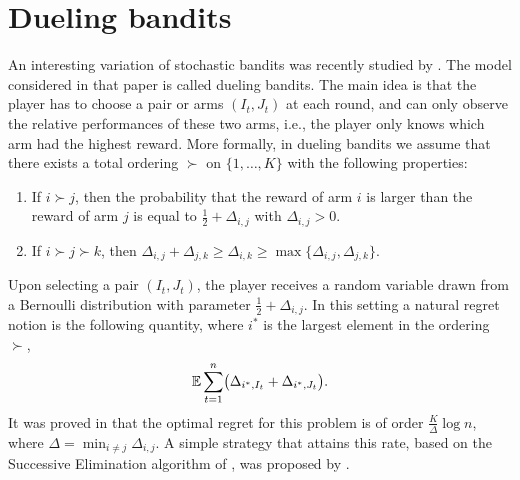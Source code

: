 \section{Dueling bandits} \label{sec:dueling}
An interesting variation of stochastic bandits was recently studied by \cite{YBKJ09}. The model considered in that paper is called dueling bandits. The main idea is that the player has to choose a pair or arms $(I_t, J_t)$ at each round, and can only observe the relative performances of these two arms, i.e., the player only knows which arm had the highest reward. More formally, in dueling bandits we assume that there exists a total ordering $\succ$ on $\{1,\hdots,K\}$ with the following properties:
\begin{enumerate}
\item If $i \succ j$, then the probability that the reward of arm $i$ is larger than the reward of arm $j$ is equal to $\frac12 + \Delta_{i,j}$ with $\Delta_{i,j} >0$.
\item If $i \succ j \succ k$, then $\Delta_{i,j} + \Delta_{j,k} \geq \Delta_{i,k} \geq \max\bigl\{\Delta_{i,j}, \Delta_{j,k}\bigr\}$.
\end{enumerate}
Upon selecting a pair $(I_t, J_t)$, the player receives a random variable drawn from a Bernoulli distribution with parameter $\frac12+\Delta_{i,j}$. In this setting a natural regret notion is the following quantity, where $i^*$ is the largest element in the ordering $\succ$,
$$\mathbb{E} \sum_{t=1}^n \bigl(\Delta_{i^*, I_t} + \Delta_{i^*, J_t} \bigr) .$$
It was proved in \cite{YBKJ09} that the optimal regret for this problem is of order $\frac{K}{\Delta} \log n$, where $\Delta = \min_{i \neq j} \Delta_{i,j}$. A simple strategy that attains this rate, based on the Successive Elimination algorithm of \cite{EMM02}, was proposed by \cite{YJ11}.

